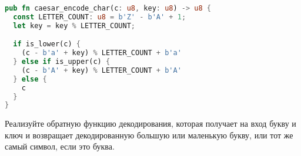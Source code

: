 \begin{lstlisting}[language=Rust]
pub fn caesar_encode_char(c: u8, key: u8) -> u8 {
  const LETTER_COUNT: u8 = b'Z' - b'A' + 1;
  let key = key % LETTER_COUNT;

  if is_lower(c) {
    (c - b'a' + key) % LETTER_COUNT + b'a'
  } else if is_upper(c) {
    (c - b'A' + key) % LETTER_COUNT + b'A'
  } else {
    c
  }
}
\end{lstlisting}

\begin{Exercise}
  \Question
  Реализуйте обратную функцию декодирования, которая получает на вход букву и ключ и возвращает декодированную большую или маленькую букву, или тот же самый символ, если это буква.
\end{Exercise}

